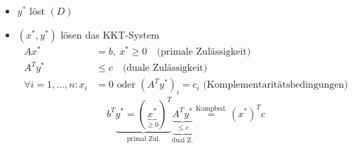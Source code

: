 \begin{itemize}
\begin{itemize}
			\item $y^*$ löst $(D)$ 
			\item $(x^*,y^*)$ lösen das KKT-System 
				\begin{align*}
					Ax^* &= b , \ x^* \geq 0 \quad \text{(primale Zulässigkeit)}\\
					A^{T} y^* &\leq c\quad \text{(duale Zulässigkeit)}\\
					\forall i = 1,\dots , n: x_{i}&= 0 \text{ oder } \left(A^{T}y^*  \right)_{i} = c_{i} \text{ (Komplementaritätsbedingungen)}
				\end{align*} 
				\begin{equation*}
					b^{T}\underbrace{y^* = (\underbrace{x^*}_{\geq 0})^{T}}_{\text{primal Zul.}} \underbrace{\underbrace{A^{T} y^*}_{\leq c }}_{\text{dual Z.}} \stackrel{\text{Kompbed.}}= \left(x^*\right)^{T} c
				\end{equation*} 
		\end{itemize} 
		

\end{itemize}
